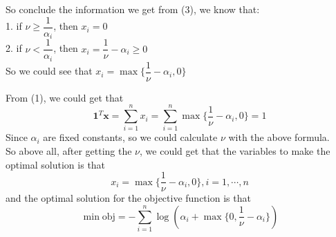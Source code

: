 So conclude the information we get from (3), we know that:\\
1. if $\nu\geq\dfrac{1}{\alpha_i}$, then $x_i=0$\\
2. if $\nu<\dfrac{1}{\alpha_i}$, then $x_i=\dfrac{1}{\nu}-\alpha_i\geq 0$\\
So we could see that $x_i=\max\{\dfrac{1}{\nu}-\alpha_i,0\}$

From (1), we could get that
$$\mathbf{1}^T\mathbf{x}=\sum_{i=1}^nx_i=\sum_{i=1}^n\max\{\dfrac{1}{\nu}-\alpha_i,0\}=1$$
Since $\alpha_i$ are fixed constants, so we could calculate $\nu$ with the above formula.\\
So above all, after getting the $\nu$, we could get that the variables to make the optimal solution is that $$x_i=\max\{\dfrac{1}{\nu}-\alpha_i,0\}, i=1,\cdots,n$$
and the optimal solution for the objective function is that
$$\min \text{obj} = -\sum_{i=1}^n\log \left(\alpha_i+\max\{ 0, \dfrac{1}{\nu}-\alpha_i \} \right)$$
